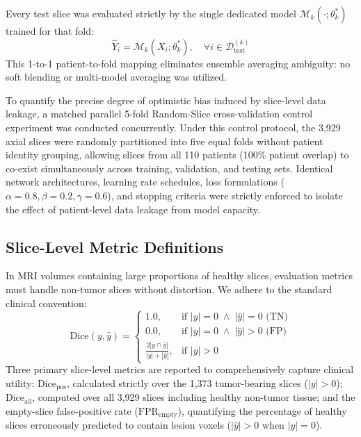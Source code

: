 \documentclass[preprint,3p,times,onecolumn]{elsarticle}
\begin{document}
Every test slice was evaluated strictly by the single dedicated model $\mathcal{M}_k(\cdot; \theta_k^*)$ trained for that fold:
\begin{equation}
\hat{Y}_i = \mathcal{M}_k(X_i; \theta_k^*), \quad \forall i \in \mathcal{D}_{\text{test}}^{(k)}
\end{equation}
This 1-to-1 patient-to-fold mapping eliminates ensemble averaging ambiguity: no soft blending or multi-model averaging was utilized.

To quantify the precise degree of optimistic bias induced by slice-level data leakage, a matched parallel 5-fold Random-Slice cross-validation control experiment was conducted concurrently. Under this control protocol, the 3,929 axial slices were randomly partitioned into five equal folds without patient identity grouping, allowing slices from all 110 patients (100\% patient overlap) to co-exist simultaneously across training, validation, and testing sets. Identical network architectures, learning rate schedules, loss formulations ($\alpha=0.8, \beta=0.2, \gamma=0.6$), and stopping criteria were strictly enforced to isolate the effect of patient-level data leakage from model capacity.

\subsection{Slice-Level Metric Definitions}
In MRI volumes containing large proportions of healthy slices, evaluation metrics must handle non-tumor slices without distortion. We adhere to the standard clinical convention:
\begin{equation}
\text{Dice}(y, \hat{y}) = \begin{cases}
1.0, & \text{if } |y| = 0 \;\land\; |\hat{y}| = 0 \text{ (TN)} \\
0.0, & \text{if } |y| = 0 \;\land\; |\hat{y}| > 0 \text{ (FP)} \\
\frac{2|y \cap \hat{y}|}{|y| + |\hat{y}|}, & \text{if } |y| > 0
\end{cases}
\end{equation}
Three primary slice-level metrics are reported to comprehensively capture clinical utility: $\text{Dice}_{\text{pos}}$, calculated strictly over the 1,373 tumor-bearing slices ($|y| > 0$); $\text{Dice}_{\text{all}}$, computed over all 3,929 slices including healthy non-tumor tissue; and the empty-slice false-positive rate ($\text{FPR}_{\text{empty}}$), quantifying the percentage of healthy slices erroneously predicted to contain lesion voxels ($|\hat{y}| > 0$ when $|y| = 0$).
\end{document}
